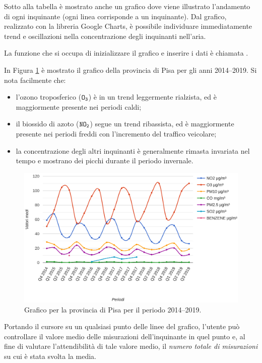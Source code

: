 Sotto alla tabella è mostrato anche un grafico dove viene illustrato l'andamento
di ogni inquinante (ogni linea corrisponde a un inquinante). Dal grafico,
realizzato con la libreria Google Charts, è possibile individuare immediatamente
trend e oscillazioni nella concentrazione degli inquinanti nell'aria.

La funzione che si occupa di inizializzare il grafico e inserire i dati è
chiamata .

In Figura \ref{fig:graph} è mostrato il grafico della provincia di Pisa per gli
anni 2014--2019. Si nota facilmente che:
\begin{itemize}
	\item l'ozono troposferico (\(\mathtt{O_3}\)) è in un trend leggermente
		rialzista, ed è maggiormente presente nei periodi caldi;
	\item il biossido di azoto (\(\mathtt{NO_2}\)) segue un trend ribassista,
		ed è maggiormente presente nei periodi freddi con l'incremento
		del traffico veicolare;
	\item la concentrazione degli altri inquinanti è generalmente rimasta
		invariata nel tempo e mostrano dei picchi durante il periodo
		invernale.
\end{itemize}

\begin{figure}[htp]
	\centering
	\includegraphics[width=\textwidth]{img/graph}
	\caption{Grafico per la provincia di Pisa per il periodo
	2014--2019.}\label{fig:graph}
\end{figure}

Portando il cursore su un qualsiasi punto delle linee del grafico, l'utente può
controllare il valore medio delle misurazioni dell'inquinante in quel punto e,
al fine di valutare l'attendibilità di tale valore medio, il \emph{numero totale
di misurazioni} su cui è stata svolta la media.
